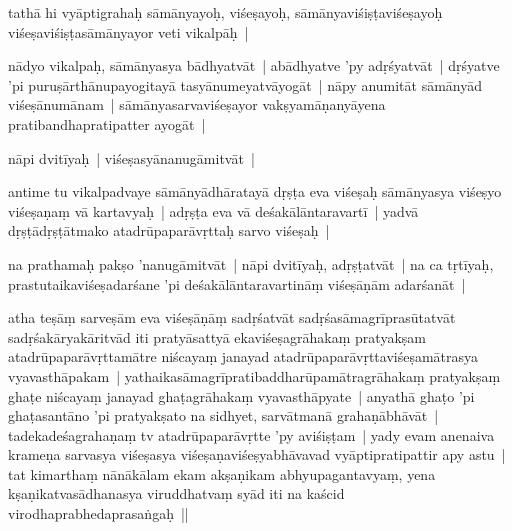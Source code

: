 \documentclass[article,12pt,a4paper]{memoir}%
\newcounter{parCount}
\begin{document}
	  \pstart \leavevmode%
	\label{thakur75-73.25}tathā hi vyāptigrahaḥ sāmānyayoḥ, viśeṣayoḥ, sāmānyaviśiṣṭaviśeṣayoḥ viśeṣaviśiṣṭasāmānyayor veti vikalpāḥ |
	{}
	\pend%
      

	  \pstart \leavevmode%
	\label{thakur75-73.27}nādyo vikalpaḥ, sāmānyasya bādhyatvāt | abādhyatve 'py adṛśyatvāt | dṛśyatve 'pi puruṣārthānupayogitayā tasyānumeyatvāyogāt | nāpy anumitāt sāmānyād viśeṣānumānam | sāmānyasarvaviśeṣayor vakṣyamāṇanyāyena pratibandhapratipatter ayogāt |
	{}
	\pend%
      

	  \pstart \leavevmode%
	\label{thakur75-74.1}nāpi dvitīyaḥ | viśeṣasyānanugāmitvāt |
	{}
	\pend%
      

	  \pstart \leavevmode%
	\label{thakur75-74.2}antime tu vikalpadvaye sāmānyādhāratayā dṛṣṭa eva viśeṣaḥ sāmānyasya viśeṣyo viśeṣaṇaṃ vā kartavyaḥ | adṛṣṭa eva vā deśakālāntaravartī | yadvā dṛṣṭādṛṣṭātmako atadrūpaparāvṛttaḥ sarvo viśeṣaḥ |
	{}
	\pend%
      

	  \pstart \leavevmode%
	\label{thakur75-74.5}na prathamaḥ pakṣo 'nanugāmitvāt | nāpi dvitīyaḥ, adṛṣṭatvāt | na ca tṛtīyaḥ, prastutaikaviśeṣadarśane 'pi deśakālāntaravartināṃ viśeṣāṇām adarśanāt |
	{}
	\pend%
      

	  \pstart \leavevmode%
	\label{thakur75-74.7}atha teṣāṃ sarveṣām eva viśeṣāṇāṃ sadṛśatvāt sadṛśasāmagrīprasūtatvāt sadṛśakāryakāritvād iti pratyāsattyā ekaviśeṣagrāhakaṃ pratyakṣam atadrūpaparāvṛttamātre niścayaṃ janayad atadrūpaparāvṛttaviśeṣamātrasya vyavasthāpakam |\label{thakur75-74.9} yathaikasāmagrīpratibaddharūpamātragrāhakaṃ pratyakṣaṃ ghaṭe niścayaṃ janayad ghaṭagrāhakaṃ vyavasthāpyate | anyathā ghaṭo 'pi ghaṭasantāno 'pi pratyakṣato na sidhyet, sarvātmanā grahaṇābhāvāt | \label{thakur75-74.12} tadekadeśagrahaṇaṃ tv atadrūpaparāvṛtte 'py aviśiṣṭam | yady evam anenaiva krameṇa sarvasya viśeṣasya viśeṣaṇaviśeṣyabhāvavad vyāptipratipattir apy astu | \label{thakur75-74.13} tat kimarthaṃ nānākālam ekam akṣaṇikam abhyupagantavyaṃ, yena kṣaṇikatvasādhanasya viruddhatvaṃ syād iti na kaścid virodhaprabhedaprasaṅgaḥ ||
	{}
	\pend%
      
\end{document}
